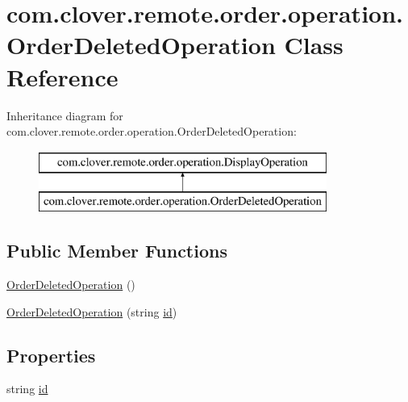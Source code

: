 \hypertarget{classcom_1_1clover_1_1remote_1_1order_1_1operation_1_1_order_deleted_operation}{}\section{com.\+clover.\+remote.\+order.\+operation.\+Order\+Deleted\+Operation Class Reference}
\label{classcom_1_1clover_1_1remote_1_1order_1_1operation_1_1_order_deleted_operation}
Inheritance diagram for com.\+clover.\+remote.\+order.\+operation.\+Order\+Deleted\+Operation\+:\begin{figure}[H]
\begin{center}
\leavevmode
\includegraphics[height=2.000000cm]{classcom_1_1clover_1_1remote_1_1order_1_1operation_1_1_order_deleted_operation}
\end{center}
\end{figure}
\subsection*{Public Member Functions}
\begin{DoxyCompactItemize}
\item 
\hyperlink{classcom_1_1clover_1_1remote_1_1order_1_1operation_1_1_order_deleted_operation_ae69b1ce2e2982c31c9e280cd12b32dce}{Order\+Deleted\+Operation} ()
\item 
\hyperlink{classcom_1_1clover_1_1remote_1_1order_1_1operation_1_1_order_deleted_operation_a5fb7913eb5201fdbe0d43fd4f72d2f57}{Order\+Deleted\+Operation} (string \hyperlink{classcom_1_1clover_1_1remote_1_1order_1_1operation_1_1_order_deleted_operation_a9a68575627e956f9593dbf0e0171a3ae}{id})
\end{DoxyCompactItemize}
\subsection*{Properties}
\begin{DoxyCompactItemize}
\item 
string \hyperlink{classcom_1_1clover_1_1remote_1_1order_1_1operation_1_1_order_deleted_operation_a9a68575627e956f9593dbf0e0171a3ae}{id}
\end{DoxyCompactItemize}


